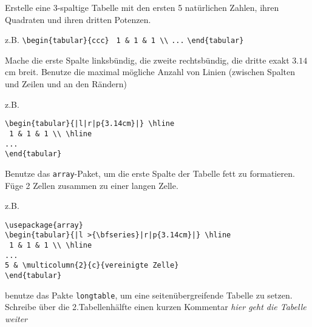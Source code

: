 \item Erstelle eine 3-spaltige Tabelle mit den ersten 5 natürlichen Zahlen, ihren Quadraten und ihren dritten Potenzen. 

\begin{loesung}
z.B. 
\verb|\begin{tabular}{ccc}|
\verb| 1 & 1 & 1 \\|
\verb|...|
\verb|\end{tabular}|
\end{loesung}

\item Mache die erste Spalte linksbündig, die zweite rechtsbündig, die dritte exakt $3.14\,$cm breit. Benutze 
die maximal mögliche Anzahl von Linien (zwischen Spalten und Zeilen und an den Rändern)

\begin{loesung}
z.B. 
\begin{verbatim}
\begin{tabular}{|l|r|p{3.14cm}|} \hline
 1 & 1 & 1 \\ \hline
...
\end{tabular}
\end{verbatim}
\end{loesung}



\item Benutze das \texttt{array}-Paket, um die erste Spalte der Tabelle fett zu formatieren. Füge 2 Zellen zusammen zu einer langen Zelle.


\begin{loesung}
z.B. 
\begin{verbatim}
\usepackage{array}
\begin{tabular}{|l >{\bfseries}|r|p{3.14cm}|} \hline
 1 & 1 & 1 \\ \hline
...
5 & \multicolumn{2}{c}{vereinigte Zelle}
\end{tabular}
\end{verbatim}
\end{loesung}

\item benutze das Pakte \texttt{longtable}, um eine seitenübergreifende Tabelle zu setzen. Schreibe über die 2.Tabellenhälfte einen kurzen Kommentar 
\emph{hier geht die Tabelle weiter}


